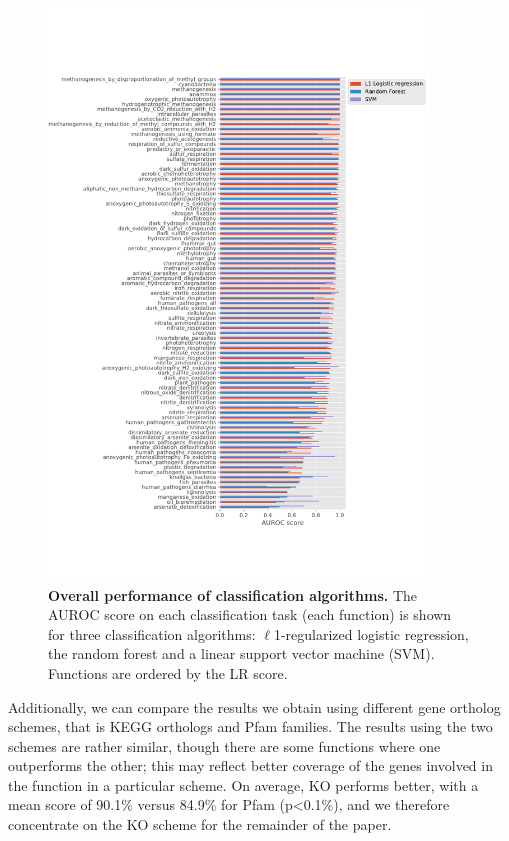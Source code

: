 \documentclass[10pt,letterpaper]{article}
\begin{document}
\begin{figure}[!h]
\includegraphics[width=0.9\textwidth]{algo_compare}
\caption{{\bf Overall performance of classification algorithms.}
The AUROC score on each classification task (each function) is shown for three classification algorithms: $\ell$1-regularized logistic regression, the random forest and a linear support vector machine (SVM). Functions are ordered by the LR score.}
\label{fig1}
\end{figure}

Additionally, we can compare the results we obtain using different gene ortholog schemes, that is KEGG orthologs and Pfam families. The results using the two schemes are rather similar, though there are some functions where one outperforms the other; this may reflect better coverage of the genes involved in the function in a particular scheme. On average, KO performs better, with a mean score of 90.1\% versus 84.9\% for Pfam (p<0.1\%), and we therefore concentrate on the KO scheme for the remainder of the paper.
\end{document}
